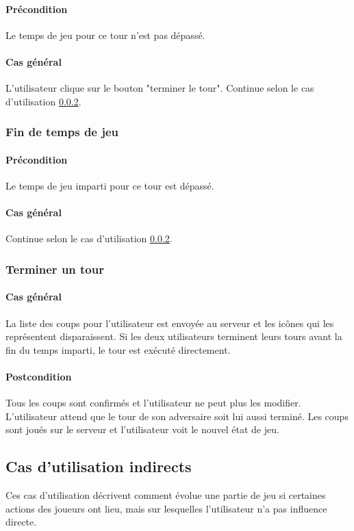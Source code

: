     \paragraph{Précondition} Le temps de jeu pour ce tour n'est pas dépassé.
    \paragraph{Cas général} L'utilisateur clique sur le bouton "terminer le tour". Continue selon le cas d'utilisation \ref{UC:endTurn}.

\subsubsection{Fin de temps de jeu}
    \paragraph{Précondition} Le temps de jeu imparti pour ce tour est dépassé.
    \paragraph{Cas général} Continue selon le cas d'utilisation \ref{UC:endTurn}.

\subsubsection{Terminer un tour}
    \label{UC:endTurn}
    \paragraph{Cas général} La liste des coups pour l'utilisateur est envoyée au serveur et les icônes qui les représentent disparaissent. Si les deux utilisateurs terminent leurs tours avant la fin du temps imparti, le tour est exécuté directement.
    \paragraph{Postcondition} Tous les coups sont confirmés et l'utilisateur ne peut plus les modifier. L'utilisateur attend que le tour de son adversaire soit lui aussi terminé. Les coups sont joués sur le serveur et l'utilisateur voit le nouvel état de jeu.

\subsection{Cas d'utilisation indirects}
Ces cas d'utilisation décrivent comment évolue une partie de jeu si certaines actions des joueurs ont lieu, mais sur lesquelles l'utilisateur n'a pas influence directe.

